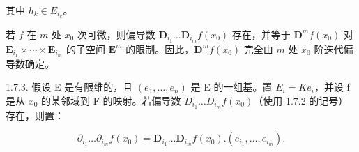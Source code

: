 其中 \(h_{k} \in E_{i_{k}}\)。

若 \(f\) 在 \(m\) 处 \(x_{0}\) 次可微，则偏导数 \(\mathbf{D}_{i_{1}}\ldots\mathbf{D}_{i_{m}}f(x_{0})\) 存在，并等于 \(\mathbf{D}^{m}f(x_{0})\) 对 \(\mathbf{E}_{i_{1}}\times\cdots\times\mathbf{E}_{i_{m}}\) 的子空间 \(\mathbf{E}^{m}\) 的限制。因此，\(\mathbf{D}^{m}f(x_{0})\) 完全由 \(m\) 处 \(x_{0}\) 阶迭代偏导数确定。

1.7.3. 假设 E 是有限维的，且 \((e_{1},\ldots,e_{n})\) 是 E 的一组基。置 \(E_{i}=Ke_{i}\)，并设 f 是从 \(x_{0}\) 的某邻域到 F 的映射。若偏导数 \(D_{i_{1}}\ldots D_{i_{m}}f(x_{0})\)（使用 1.7.2 的记号）存在，则置：

\[
\partial_ {i _ {1}} \dots \partial_ {i _ {m}} f (x _ {0}) = \mathbf {D} _ {i _ {1}} \dots \mathbf {D} _ {i _ {m}} f (x _ {0}). (e _ {i _ {1}}, \dots , e _ {i _ {m}}).
\]

